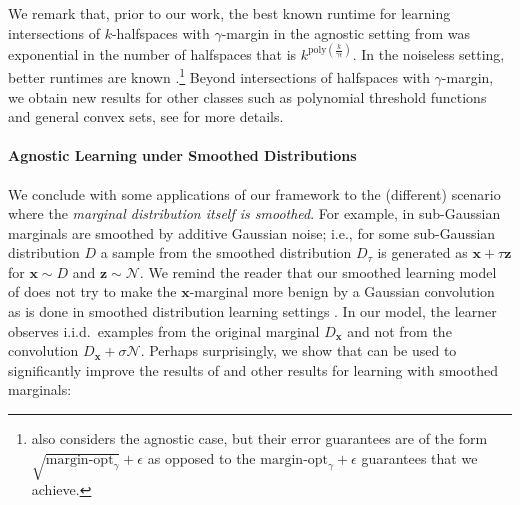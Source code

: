 \documentclass{theoretics}
\renewcommand\vec[1]{\mathbf{#1}}
\newcommand{\normal}{\mathcal{N}}
\newcommand{\eps}{\epsilon}
\newcommand{\poly}{\mathrm{poly}}
\newcommand{\1}{\Ind}
\newcommand{\x}{\vec x}
\begin{document}
We remark that, prior to our work, the best known runtime for learning intersections of
$k$-halfspaces with $\gamma$-margin in the agnostic setting from \cite{ArriagaVempala:99}
was exponential in the number of halfspaces that is $k^{\poly(\frac{k}{\gamma \eps})}$.  
In the noiseless setting, better runtimes are known \cite{klivans-servedio-margin,Gottlieb_margin,goel2019learning}.\footnote{\cite{goel2019learning} also considers the agnostic case, but their error guarantees are of the form $\sqrt{\mathrm{margin}\text{-}\mathrm{opt}_\gamma} + \eps$ as opposed to the $\mathrm{margin}\text{-}\mathrm{opt}_\gamma+\epsilon$ guarantees that we achieve.}
Beyond intersections of halfspaces with $\gamma$-margin, we obtain new results for other 
classes such as polynomial threshold functions and general convex sets, see  
for more details.






\paragraph{Agnostic Learning under Smoothed Distributions}
We conclude with some applications of our framework to the (different) scenario where the {\em marginal distribution itself is smoothed}.
For example, in \cite{Kane2013LearningHalfspacesLogConcave} sub-Gaussian marginals are smoothed by additive 
Gaussian noise; i.e., for some sub-Gaussian distribution $D$ a sample from 
the smoothed distribution $D_\tau$ is generated as $\x + \tau \vec z$ for $\x \sim D$
and $\vec z \sim \normal$.  
We remind the reader that our smoothed learning model of  does not try to make the $\x$-marginal more benign by a Gaussian convolution as is done in smoothed distribution learning settings \cite{kalai2008decision,kalai2009learning,Kane2013LearningHalfspacesLogConcave}.  In our model, the learner observes i.i.d.\ examples from the original marginal $D_\x$ and not 
from the convolution $D_\x + \sigma \normal$.  
Perhaps surprisingly, we show that  can be used to significantly improve the results of \cite{Kane2013LearningHalfspacesLogConcave} and other results for learning with smoothed marginals:
\end{document}
